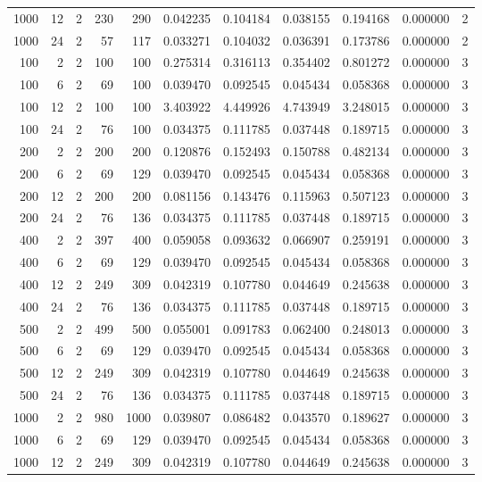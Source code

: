 \begin{table}
\begin{tabular}{rrrrrrrrrrr}
1000 & 12 & 2 & 230 & 290 & 0.042235 & 0.104184 & 0.038155 & 0.194168 & 0.000000 & 2 \\
1000 & 24 & 2 & 57 & 117 & 0.033271 & 0.104032 & 0.036391 & 0.173786 & 0.000000 & 2 \\
100 & 2 & 2 & 100 & 100 & 0.275314 & 0.316113 & 0.354402 & 0.801272 & 0.000000 & 3 \\
100 & 6 & 2 & 69 & 100 & 0.039470 & 0.092545 & 0.045434 & 0.058368 & 0.000000 & 3 \\
100 & 12 & 2 & 100 & 100 & 3.403922 & 4.449926 & 4.743949 & 3.248015 & 0.000000 & 3 \\
100 & 24 & 2 & 76 & 100 & 0.034375 & 0.111785 & 0.037448 & 0.189715 & 0.000000 & 3 \\
200 & 2 & 2 & 200 & 200 & 0.120876 & 0.152493 & 0.150788 & 0.482134 & 0.000000 & 3 \\
200 & 6 & 2 & 69 & 129 & 0.039470 & 0.092545 & 0.045434 & 0.058368 & 0.000000 & 3 \\
200 & 12 & 2 & 200 & 200 & 0.081156 & 0.143476 & 0.115963 & 0.507123 & 0.000000 & 3 \\
200 & 24 & 2 & 76 & 136 & 0.034375 & 0.111785 & 0.037448 & 0.189715 & 0.000000 & 3 \\
400 & 2 & 2 & 397 & 400 & 0.059058 & 0.093632 & 0.066907 & 0.259191 & 0.000000 & 3 \\
400 & 6 & 2 & 69 & 129 & 0.039470 & 0.092545 & 0.045434 & 0.058368 & 0.000000 & 3 \\
400 & 12 & 2 & 249 & 309 & 0.042319 & 0.107780 & 0.044649 & 0.245638 & 0.000000 & 3 \\
400 & 24 & 2 & 76 & 136 & 0.034375 & 0.111785 & 0.037448 & 0.189715 & 0.000000 & 3 \\
500 & 2 & 2 & 499 & 500 & 0.055001 & 0.091783 & 0.062400 & 0.248013 & 0.000000 & 3 \\
500 & 6 & 2 & 69 & 129 & 0.039470 & 0.092545 & 0.045434 & 0.058368 & 0.000000 & 3 \\
500 & 12 & 2 & 249 & 309 & 0.042319 & 0.107780 & 0.044649 & 0.245638 & 0.000000 & 3 \\
500 & 24 & 2 & 76 & 136 & 0.034375 & 0.111785 & 0.037448 & 0.189715 & 0.000000 & 3 \\
1000 & 2 & 2 & 980 & 1000 & 0.039807 & 0.086482 & 0.043570 & 0.189627 & 0.000000 & 3 \\
1000 & 6 & 2 & 69 & 129 & 0.039470 & 0.092545 & 0.045434 & 0.058368 & 0.000000 & 3 \\
1000 & 12 & 2 & 249 & 309 & 0.042319 & 0.107780 & 0.044649 & 0.245638 & 0.000000 & 3 \\

\end{tabular}
\end{table}
